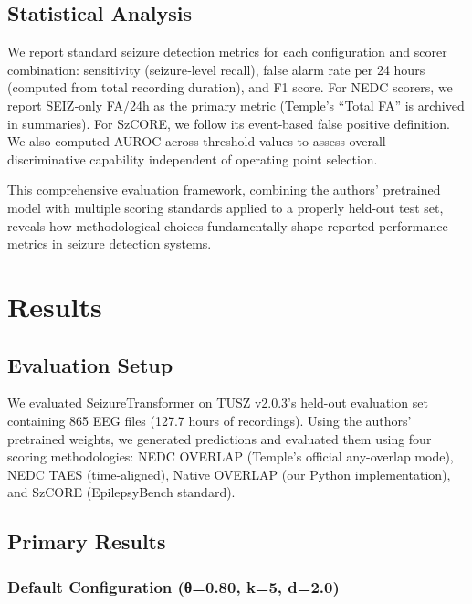\documentclass[
  10pt,
]{article}
\begin{document}
\hypertarget{statistical-analysis}{%
\subsection{Statistical Analysis}\label{statistical-analysis}}

We report standard seizure detection metrics for each configuration and
scorer combination: sensitivity (seizure‑level recall), false alarm rate
per 24 hours (computed from total recording duration), and F1 score. For
NEDC scorers, we report SEIZ‑only FA/24h as the primary metric (Temple's
``Total FA'' is archived in summaries). For SzCORE, we follow its
event‑based false positive definition. We also computed AUROC across
threshold values to assess overall discriminative capability independent
of operating point selection.

This comprehensive evaluation framework, combining the authors'
pretrained model with multiple scoring standards applied to a properly
held-out test set, reveals how methodological choices fundamentally
shape reported performance metrics in seizure detection systems.



\hypertarget{results}{%
\section{Results}\label{results}}

\hypertarget{evaluation-setup}{%
\subsection{Evaluation Setup}\label{evaluation-setup}}

We evaluated SeizureTransformer on TUSZ v2.0.3's held-out evaluation set
containing 865 EEG files (127.7 hours of recordings). Using the authors'
pretrained weights, we generated predictions and evaluated them using
four scoring methodologies: NEDC OVERLAP (Temple's official any-overlap
mode), NEDC TAES (time-aligned), Native OVERLAP (our Python
implementation), and SzCORE (EpilepsyBench standard).

\hypertarget{primary-results}{%
\subsection{Primary Results}\label{primary-results}}

\hypertarget{default-configuration-ux3b80.80-k5-d2.0}{%
\subsubsection{Default Configuration (θ=0.80, k=5,
d=2.0)}\label{default-configuration-ux3b80.80-k5-d2.0}}
\end{document}
